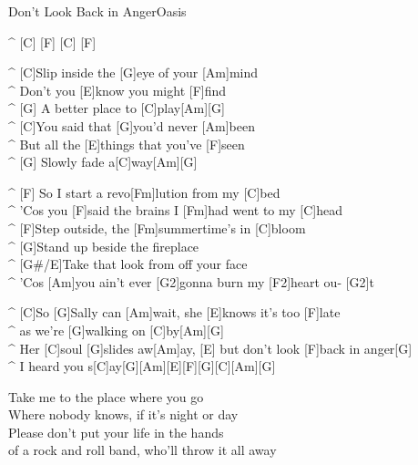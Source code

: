 \begin{song}{Don't Look Back in Anger}{Oasis}

\begin{guitar}
^ [C] [F] [C] [F]\\

\end{guitar}
\begin{guitar}
^ [C]Slip inside the [G]eye of your [Am]mind\\
^ Don't you [E]know you might [F]find\\
^ [G]  A better place to [C]play[Am][G]\\
^ [C]You said that [G]you'd never [Am]been\\
^ But all the [E]things that you've [F]seen\\
^ [G]  Slowly fade a[C]way[Am][G]\\
\end{guitar}

\medskip
\begin{guitar}
^ [F]  So I start a revo[Fm]lution from my [C]bed\\
^ 'Cos you [F]said the brains I [Fm]had went to my [C]head\\
^ [F]Step outside, the [Fm]summertime's in [C]bloom\\
^ [G]Stand up beside the fireplace\\
^ [G#/E]Take that look from off your face\\
^ 'Cos [Am]you ain't ever [G2]gonna burn my [F2]heart ou- [G2]t\\
\end{guitar}

\medskip
{}
\begin{guitar}
^ [C]So [G]Sally can [Am]wait, she [E]knows it's too [F]late\\
^ as we're [G]walking on [C]by[Am][G]\\
^ Her [C]soul [G]slides aw[Am]ay, [E] but don't look [F]back in anger[G]\\
^ I heard you s[C]ay[G][Am][E][F][G][C][Am][G]\\
\end{guitar}

\medskip
{}
\begin{guitar}
Take me to the place where you go\\
Where nobody knows, if it's night or day\\
Please don't put your life in the hands\\
of a rock and roll band, who'll throw it all away\\
\end{guitar}


\end{song}
